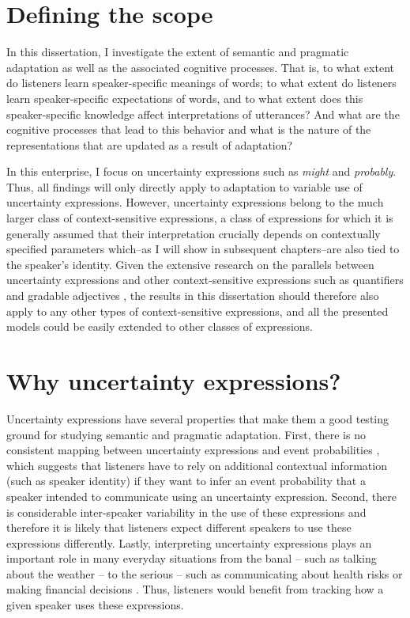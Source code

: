 \section{Defining the scope}

In this dissertation, I investigate the extent of semantic and pragmatic adaptation as well as
the associated cognitive processes. That is, to what extent do listeners learn speaker-specific
meanings of words; to what extent do listeners learn speaker-specific expectations of words,
and to what extent does this speaker-specific knowledge affect interpretations of utterances? 
And what are the cognitive processes that lead to this behavior and what is the nature of the
representations that are updated as a result of adaptation?

In this enterprise, I focus on uncertainty expressions
such as \emph{might} and \emph{probably}. Thus, all findings will only directly apply to 
adaptation to variable use of uncertainty expressions. However, uncertainty expressions 
belong to the much larger class of context-sensitive expressions, a class of expressions for 
which it is generally assumed  that their interpretation crucially depends on contextually 
specified parameters which--as I will show in subsequent chapters--are
also tied to the speaker's identity. Given the extensive research on the parallels between
uncertainty expressions and other context-sensitive expressions such as quantifiers and
gradable adjectives \cite{Lassiter2016, SchoellerFranke2017}, the results in this dissertation
should therefore also apply to any other types of context-sensitive expressions, and all
the presented models could be easily extended to other classes of expressions. 

\section{Why uncertainty expressions?}
\label{sec:why-uncertainty-expressions}

Uncertainty expressions have several properties that make them a good testing ground for studying semantic and pragmatic
adaptation. First, there is no consistent mapping between uncertainty expressions and event probabilities \cite{e.g., Clark1990,Pepper1974}, 
which suggests that listeners have to rely on additional contextual information (such as speaker identity)
if they want to infer an event probability that a speaker intended to communicate using an uncertainty expression. Second, there is considerable inter-speaker variability 
in the use of these expressions \cite{Wallsten1986} and therefore it is likely that listeners expect different speakers to use these expressions
differently. Lastly, interpreting uncertainty expressions plays an important role in many everyday situations from the banal -- 
such as talking about the weather -- to the serious -- such as communicating about health risks 
\cite{Berry2004, Lipkus2007, Politi2007} or making financial decisions \cite{Doupnik2003}. 
Thus, listeners would benefit from tracking  how a given speaker uses these expressions. 

